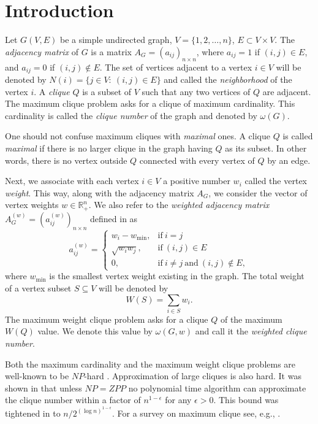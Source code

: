 \documentclass[11pt]{article}
\begin{document}
\section{Introduction}
Let $G(V,E)$ be a simple undirected graph, $V=\{1,2, \ldots ,n\}$,
$E \subset V \times V$.
The {\em adjacency matrix\/} of $G$ is a matrix $A_G=(a_{ij})_{n \times n}$,
where $a_{ij} = 1$ if $(i,j) \in E$, and $a_{ij}=0$ if $(i,j) \notin E$.
The set of vertices adjacent to a vertex $i \in V$ will be denoted by
$N(i) = \{j \in V: \ (i,j) \in E\}$ and called the {\em neighborhood} of
the vertex $i$. A {\em clique\/} $Q$ is a subset of $V$ such that any two
vertices of $Q$ are adjacent. The maximum clique problem asks for a clique
of maximum cardinality. This cardinality is called the {\em clique number\/}
of the graph and denoted by $\omega(G)$.

One should not confuse maximum cliques with {\em maximal\/} ones. A clique
$Q$ is called {\em maximal\/} if there is no larger clique in the graph having
$Q$ as its subset. In other words, there is no vertex outside $Q$ connected
with every vertex of $Q$ by an edge.

Next, we associate with each vertex $i \in V$ a positive number $w_i$
called the vertex {\em weight}. This way, along with the adjacency
matrix $A_G$, we consider the vector of vertex weights $w \in \mathbb{R}_+^n$.
We also refer to the {\em weighted adjacency matrix}
$A^{(w)}_G=(a^{(w)}_{ij})_{n \times n}$ defined in \cite{B02} as
\begin{equation}
\label{eq:agw}
a^{(w)}_{ij} = \left\{ \begin{array}{rl}
  w_i-w_{\min},   & \textrm{if} \ i=j \\
  \sqrt{w_i w_j}, & \textrm{if} \ (i,j) \in E \\
  0,              & \textrm{if} \ i \neq j \ \textrm{and} \ (i,j) \notin E,
\end{array} \right.
\end{equation}
where $w_{\min}$ is the smallest vertex weight existing in the graph.
The total weight of a vertex subset $S \subseteq V$ will be denoted by
\[ W(S) = \sum_{i \in S} w_i. \]
The maximum weight clique problem asks for a clique $Q$ of the maximum
$W(Q)$ value. We denote this value by $\omega(G,w)$ and call it the
{\em weighted clique number}.

Both the maximum cardinality and the maximum weight clique problems are
well-known to be $NP$-hard \cite{GJ79}. Approximation of large cliques is
also hard. It was shown in \cite{H96} that unless $NP=ZPP$ no polynomial
time algorithm can approximate the clique number within a factor of
$n^{1-\epsilon}$ for any $\epsilon>0$. This bound was tightened in
\cite{K01} to $n/2^{(\log n)^{1-\epsilon}}$. For a survey on maximum
clique see, e.g., \cite{BBPP99}.
\end{document}
